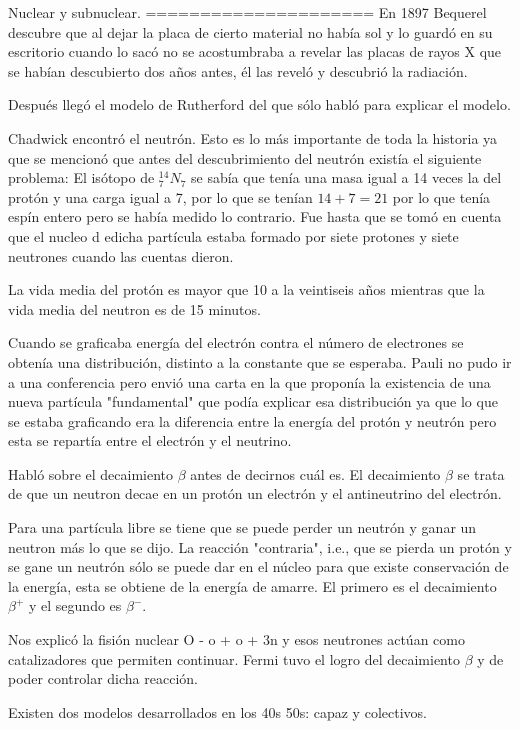 Nuclear y subnuclear.
=====================
En 1897 Bequerel descubre que al dejar la placa de cierto
material no había sol y lo guardó en su escritorio cuando lo
sacó no se acostumbraba a revelar las placas de rayos X que
se habían descubierto dos años antes, él las reveló y
descubrió la radiación.

Después llegó el modelo de Rutherford del que sólo habló
para explicar el modelo.

Chadwick encontró el neutrón. Esto es lo más importante de
toda la historia ya que se mencionó que antes del
descubrimiento del neutrón existía el siguiente problema:
El isótopo de ${}^{14}_7 N_7$ se sabía que tenía una masa
igual a 14 veces la del protón y una carga igual a 7, por lo
que se tenían $14+7=21$ por lo que tenía espín entero pero se
había medido lo contrario. Fue hasta que se tomó en cuenta
que el nucleo d edicha partícula estaba formado por siete
protones y siete neutrones cuando las cuentas dieron.

La vida media del protón es mayor que 10 a la veintiseis
años mientras que la vida media del neutron es de 15
minutos.

Cuando se graficaba energía del electrón contra el número de
electrones se obtenía una distribución, distinto a la
constante que se esperaba. Pauli no pudo ir a una
conferencia pero envió una carta en la que proponía la
existencia de una nueva partícula "fundamental" que podía
explicar esa distribución ya que lo que se estaba graficando
era la diferencia entre la energía del protón y neutrón pero
esta se repartía entre el electrón y el neutrino.

Habló sobre el decaimiento $\beta$ antes de decirnos cuál
es. El decaimiento $\beta$ se trata de que un neutron decae
en un protón un electrón y el antineutrino del electrón.

Para una partícula libre se tiene que se puede perder un
neutrón y ganar un neutron más lo que se dijo. La reacción
"contraria", i.e., que se pierda un protón y se gane un
neutrón sólo se puede dar en el núcleo para que existe
conservación de la energía, esta se obtiene de la energía de
amarre. El primero es el decaimiento $\beta^+$ y el segundo
es $\beta^-$.

Nos explicó la fisión nuclear O - o + o + 3n y esos
neutrones actúan como catalizadores que permiten continuar.
Fermi tuvo el logro del decaimiento $\beta$ y de poder
controlar dicha reacción.

Existen dos modelos desarrollados en los 40s 50s: capaz y
colectivos.

